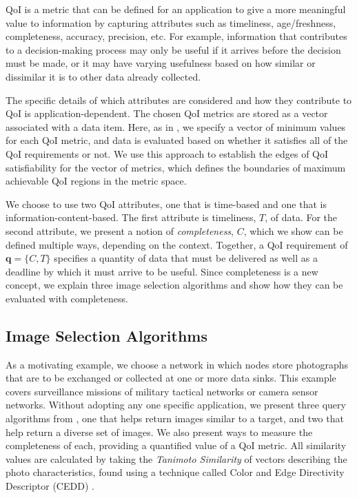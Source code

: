 QoI is a metric that can be defined for an application to give a more meaningful value to information by capturing attributes such as  timeliness, age/freshness, completeness, accuracy, precision, etc.  
For example, information that contributes to a decision-making process may only be useful if it arrives before the decision must be made, or it may have varying usefulness based on how similar or dissimilar it is to other data already collected.

The specific details of which attributes are considered and how they contribute to QoI is application-dependent.  The chosen QoI metrics are stored as a vector associated with a data item.  
Here, as in \cite{qoi_aware_tactical_mil_nets}, we specify a vector of minimum values for each QoI metric, and data is evaluated based on whether it satisfies all of the QoI requirements or not.  We use this approach to establish the edges of QoI satisfiability for the vector of metrics, which defines the boundaries of maximum achievable QoI regions in the metric space.

We choose to use two QoI attributes, one that is time-based and one that is information-content-based.  The first attribute is timeliness, $T$, of data.  For the second attribute, we present a notion of \emph{completeness}, $C$, which we show can be defined multiple ways, depending on the context.  Together, a QoI requirement of $\mathbf{q} = \{C,T\}$ specifies a quantity of data that must be delivered as well as a deadline by which it must arrive to be useful.  Since completeness is a new concept, we explain three image selection algorithms and show how they can be evaluated with completeness.

\subsection{Image Selection Algorithms}

As a motivating example, we choose a network in which nodes store photographs that are to be exchanged or collected at one or more data sinks.  This example covers surveillance missions of military tactical networks or camera sensor networks.  Without adopting any one specific application, we present three query algorithms from \cite{mediascope}, one that helps return images similar to a target, and two that help return a diverse set of images.  We also present ways to measure the completeness of each, providing a quantified value of a QoI metric.  All similarity values are calculated by taking the \emph{Tanimoto Similarity} \cite{tanimoto} of vectors describing the photo characteristics, found using a technique called Color and Edge Directivity Descriptor (CEDD) \cite{2008cedd}.


